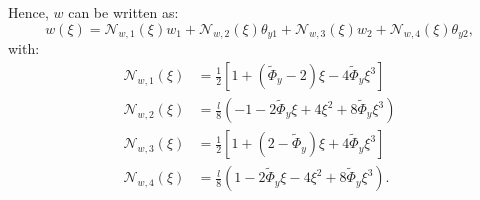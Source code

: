\documentclass[a4paper,11pt]{article}
\begin{document}
Hence, $w$ can be written as:
\begin{equation} \label{eq:w_expr_final}
	w(\xi) = \mathcal{N}_{w,1}(\xi)w_1 + \mathcal{N}_{w,2}(\xi)\theta_{y1} + \mathcal{N}_{w,3}(\xi)w_2 + \mathcal{N}_{w,4}(\xi)\theta_{y2},
\end{equation}
with:
\begin{equation}
\begin{aligned}
	\mathcal{N}_{w,1}(\xi) & =\frac{1}{2} \left[ 1 + (\tilde{\Phi}_y - 2) \xi - 4\tilde{\Phi}_y \xi^3 \right] \\
	\mathcal{N}_{w,2}(\xi) & = \frac{l}{8} \left( -1 - 2\tilde{\Phi}_y \xi + 4 \xi^2 + 8\tilde{\Phi}_y \xi^3 \right) \\
	\mathcal{N}_{w,3}(\xi) & = \frac{1}{2} \left[ 1 + (2 - \tilde{\Phi}_y) \xi + 4\tilde{\Phi}_y \xi^3 \right] \\
	\mathcal{N}_{w,4}(\xi) & = \frac{l}{8} \left( 1 - 2\tilde{\Phi}_y \xi - 4 \xi^2 + 8\tilde{\Phi}_y \xi^3 \right)	.
\end{aligned}
\end{equation}
\end{document}

